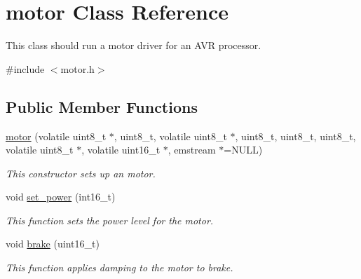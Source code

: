 \hypertarget{classmotor}{\section{motor \-Class \-Reference}
\label{classmotor}
}


\-This class should run a motor driver for an \-A\-V\-R processor.  




{\ttfamily \#include $<$motor.\-h$>$}

\subsection*{\-Public \-Member \-Functions}
\begin{DoxyCompactItemize}
\item 
\hyperlink{classmotor_a11438fa0aaec2da59468e039d71b9597}{motor} (volatile uint8\-\_\-t $\ast$, uint8\-\_\-t, volatile uint8\-\_\-t $\ast$, uint8\-\_\-t, uint8\-\_\-t, uint8\-\_\-t, volatile uint8\-\_\-t $\ast$, volatile uint16\-\_\-t $\ast$, emstream $\ast$=\-N\-U\-L\-L)
\begin{DoxyCompactList}\small\item\em \-This constructor sets up an motor. \end{DoxyCompactList}\item 
void \hyperlink{classmotor_a168a159eebb68c7a47cd4153e03c030c}{set\-\_\-power} (int16\-\_\-t)
\begin{DoxyCompactList}\small\item\em \-This function sets the power level for the motor. \end{DoxyCompactList}\item 
void \hyperlink{classmotor_abff6d2ccc592902ac6472d8078a897fa}{brake} (uint16\-\_\-t)
\begin{DoxyCompactList}\small\item\em \-This function applies damping to the motor to brake. \end{DoxyCompactList}\end{DoxyCompactItemize}
